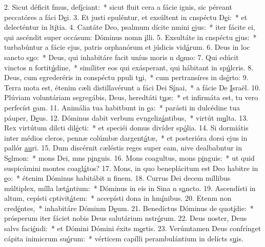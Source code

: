 2. Sicut déficit fmus, def\uline{í}ciant:~* sicut fluit cera a fácie ignis, sic péreant peccatóres a fáci D\uline{e}i.
3. Et justi epuléntur, et exsúltent in cnspéctu D\uline{e}i:~* et delecténtur in lt\uline{í}tia.
4. Cantáte Deo, psalmum dícite nmini \uline{e}jus:~* iter fácite ei, qui ascéndit super occásum: Dóminus nomn \uline{i}lli.
5. Exsultáte in cnspéctu \uline{e}jus:~* turbabúntur a fácie ejus, patris orphanórum et júdicis vid\uline{á}rum.
6. Deus in loc sancto s\uline{u}o:~* Deus, qui inhabitáre facit uníus moris n d\uline{o}mo:
7. Qui edúcit vinctos n fortit\uline{ú}dine,~* simíliter eos qui exásperant, qui hábitant in sp\uline{ú}lcris.
8. Deus, cum egrederéris in conspéctu ppuli t\uline{u}i,~* cum pertransíres in ds\uline{é}rto:
9. Terra mota est, étenim cæli distillavérunt a fáci Dei S\uline{í}nai,~* a fácie De \uline{I}sraël.
10. Plúviam voluntáriam segregábis, Deus, heredtáti t\uline{u}æ:~* et infirmáta est, tu vero perfecíst \uline{e}am.
11. Animália tua habitbunt in \uline{e}a:~* parásti in dulcédine tua páuper, D\uline{e}us.
12. Dóminus dabit verbum evngeliz\uline{á}ntibus,~* virtút m\uline{u}lta.
13. Rex virtútum dilcti dil\uline{é}cti:~* et speciéi domus divíder sp\uline{ó}lia.
14. Si dormiátis inter médios cleros, pennæ colúmbæ dargent\uline{á}tæ,~* et posterióra dorsi ejus in pallór \uline{au}ri.
15. Dum discérnit cæléstis reges super eam, nive dealbabntur in S\uline{e}lmon:~* mons Dei, mns p\uline{i}nguis.
16. Mons coagultus, mons p\uline{i}nguis:~* ut quid suspicámini montes coagl\uline{á}tos?
17. Mons, in quo beneplácitum est Deo habitre in \uline{e}o:~* étenim Dóminus habitábit n f\uline{i}nem.
18. Currus Dei decem míllibus múltiplex, mílla læt\uline{á}ntium:~* Dóminus in eis in Sina n s\uline{a}ncto.
19. Ascendísti in altum, cepísti cptivit\uline{á}tem:~* accepísti dona in hm\uline{í}nibus.
20. Etenm non cred\uline{é}ntes,~* inhabitáre Dóminm D\uline{e}um.
21. Benedíctus Dóminus de quot\uline{í}die:~* prósperum iter fáciet nobis Deus salutárium nstr\uline{ó}rum.
22. Deus noster, Deus salvs faci\uline{é}ndi:~* et Dómini Dómini éxits m\uline{o}rtis.
23. Verúmtamen Deus confrínget cápita inimicrum su\uline{ó}rum:~* vérticem capílli perambulántium in delícts s\uline{u}is.
